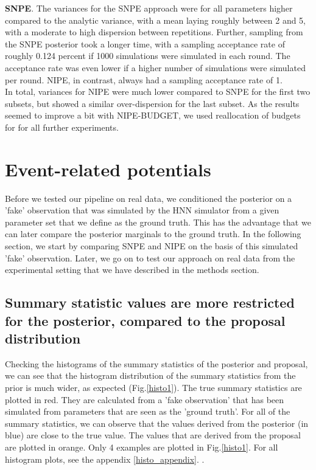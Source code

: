 \documentclass[12pt]{extreport}
\begin{document}
\textbf{SNPE}. The variances for the SNPE approach were for all parameters higher compared to the analytic variance, with a mean laying roughly between 2 and 5, with a moderate to high dispersion between repetitions. Further, sampling from the SNPE posterior took a longer time, with a sampling acceptance rate of roughly 0.124 percent if 1000 simulations were simulated in each round. The acceptance rate was even lower if a higher number of simulations were simulated per round. NIPE, in contrast, always had a sampling acceptance rate of 1.\\

In total, variances for NIPE were much lower compared to SNPE for the first two subsets, but showed a similar over-dispersion for the last subset. As the results seemed to improve a bit with NIPE-BUDGET, we used reallocation of budgets for for all further experiments.\\




\section{Event-related potentials}

Before we tested our pipeline on real data, we conditioned the posterior on a 'fake' observation that was simulated by the HNN simulator from a given parameter set that we define as the ground truth. This has the advantage that we can later compare the posterior marginals to the ground truth. In the following section, we start by comparing SNPE and NIPE on the basis of this simulated 'fake' observation. Later, we go on to test our approach on real data from the experimental setting that we have described in the methods section. 


\subsection{Summary statistic values are more restricted for the posterior, compared to the proposal distribution}

Checking the histograms of the summary statistics of the posterior and proposal, we can see that the histogram distribution of the summary statistics from the prior is much wider, as expected (Fig.\ref{histo1}). The true summary statistics are plotted in red. They are calculated from a 'fake observation' that has been simulated from parameters that are seen as the 'ground truth'. For all of the summary statistics, we can observe that the values derived from the posterior (in blue) are close to the true value. The values that are derived from the proposal are plotted in orange. Only 4 examples are plotted in Fig.\ref{histo1}. For all histogram plots, see the appendix \ref{histo_appendix}. .
\end{document}
